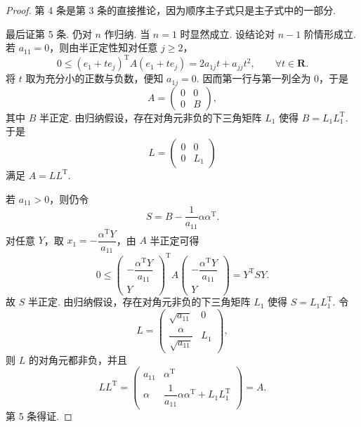 \begin{proof}
    第 4 条是第 3 条的直接推论，因为顺序主子式只是主子式中的一部分.

    最后证第 5 条. 仍对 $n$ 作归纳. 当 $n=1$ 时显然成立. 设结论对 $n-1$ 阶情形成立. 若 $a_{11}=0$，则由半正定性知对任意 $j\geqslant 2$，
    \[
        0\leqslant (e_1+te_j)^\mathrm{T}A(e_1+te_j)=2a_{1j}t+a_{jj}t^2, \qquad \forall t\in\mathbf{R}.
    \]
    将 $t$ 取为充分小的正数与负数，便知 $a_{1j}=0$. 因而第一行与第一列全为 $0$，于是
    \[
        A=\begin{pmatrix}
            0 & 0 \\
            0 & B
        \end{pmatrix},
    \]
    其中 $B$ 半正定. 由归纳假设，存在对角元非负的下三角矩阵 $L_1$ 使得 $B=L_1L_1^\mathrm{T}$. 于是
    \[
        L=\begin{pmatrix}
            0 & 0 \\
            0 & L_1
        \end{pmatrix}
    \]
    满足 $A=LL^\mathrm{T}$.

    若 $a_{11}>0$，则仍令
    \[
        S=B-\frac{1}{a_{11}}\alpha\alpha^\mathrm{T}.
    \]
    对任意 $Y$，取 $x_1=-\dfrac{\alpha^\mathrm{T}Y}{a_{11}}$，由 $A$ 半正定可得
    \[
        0\leqslant \begin{pmatrix}
            -\dfrac{\alpha^\mathrm{T}Y}{a_{11}} \\
            Y
        \end{pmatrix}^\mathrm{T}
        A
        \begin{pmatrix}
            -\dfrac{\alpha^\mathrm{T}Y}{a_{11}} \\
            Y
        \end{pmatrix}
        =Y^\mathrm{T}SY.
    \]
    故 $S$ 半正定. 由归纳假设，存在对角元非负的下三角矩阵 $L_1$ 使得 $S=L_1L_1^\mathrm{T}$. 令
    \[
        L=\begin{pmatrix}
            \sqrt{a_{11}} & 0 \\
            \dfrac{\alpha}{\sqrt{a_{11}}} & L_1
        \end{pmatrix},
    \]
    则 $L$ 的对角元都非负，并且
    \[
        LL^\mathrm{T}
        =
        \begin{pmatrix}
            a_{11} & \alpha^\mathrm{T} \\
            \alpha & \dfrac{1}{a_{11}}\alpha\alpha^\mathrm{T}+L_1L_1^\mathrm{T}
        \end{pmatrix}
        =A.
    \]
    第 5 条得证.
\end{proof}

